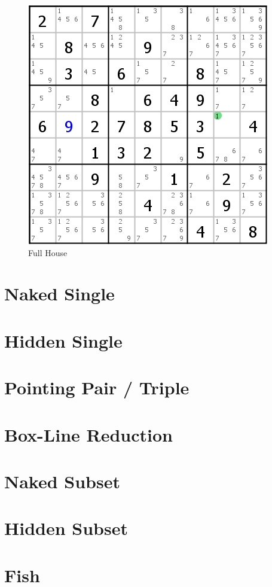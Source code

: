 \documentclass[accentcolor=tud6b,11pt,paper=a4]{tudreport}
\begin{document}
\begin{figure}[h]
\begin{center}
\includegraphics{./img/fullhouse.png}
\caption{Full House}
\end{center}
\end{figure}

\newpage
\section{Naked Single}

\section{Hidden Single}
\section{Pointing Pair / Triple}
\section{Box-Line Reduction}
\section{Naked Subset}
\section{Hidden Subset}
\section{Fish}
\end{document}
